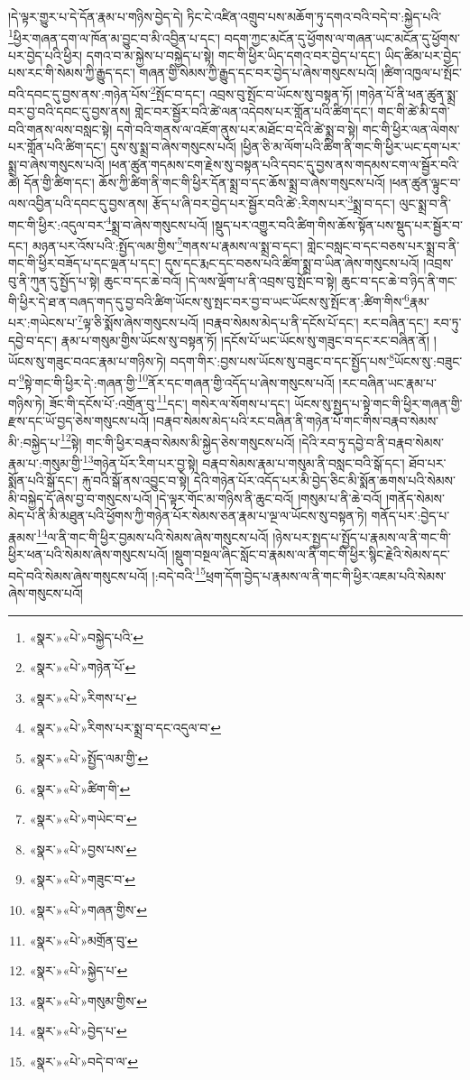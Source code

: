 །དེ་ལྟར་གྱུར་པ་དེ་དོན་རྣམ་པ་གཉིས་བྱེད་དེ། ཏིང་ངེ་འཛིན་འགྲུབ་པས་མཆོག་ཏུ་དགའ་བའི་བདེ་བ་:སྐྱེད་པའི་\footnote{«སྣར་»«པེ་»བསྐྱེད་པའི་}ཕྱིར་གཞན་དག་ལ་ཁོན་མ་བྱུང་བ་མི་འབྱིན་པ་དང་། བདག་ཀྱང་མངོན་དུ་ཕྱོགས་ལ་གཞན་ཡང་མངོན་དུ་ཕྱོགས་པར་བྱེད་པའི་ཕྱིར། དགའ་བ་མ་སྐྱེས་པ་བསྐྱེད་པ་སྟེ། གང་གི་ཕྱིར་ཡིད་དགའ་བར་བྱེད་པ་དང་། ཡིད་ཚིམ་པར་བྱེད་པས་རང་གི་སེམས་ཀྱི་རྒྱུད་དང་། གཞན་གྱི་སེམས་ཀྱི་རྒྱུད་དང་བར་བྱེད་པ་ཞེས་གསུངས་པའོ། །ཚིག་འཁྱལ་པ་སྤོང་བའི་དབང་དུ་བྱས་ནས་:གཉེན་པོས་\footnote{«སྣར་»«པེ་»གཉེན་པོ་}སྤོང་བ་དང་། འབྲས་བུ་སྤོང་བ་ཡོངས་སུ་བསྟན་ཏོ། །གཉེན་པོ་ནི་ཕན་ཚུན་སྨྲ་བར་བྱ་བའི་དབང་དུ་བྱས་ནས། གླེང་བར་སྦྱོར་བའི་ཚེ་ལན་འདེབས་པར་གློན་པའི་ཚིག་དང་། གང་གི་ཚེ་མི་དགེ་བའི་གནས་ལས་བསླང་སྟེ། དགེ་བའི་གནས་ལ་འཇོག་ནུས་པར་མཐོང་བ་དེའི་ཚེ་སྨྲ་བ་སྟེ། གང་གི་ཕྱིར་ལན་ལེགས་པར་གློན་པའི་ཚིག་དང་། དུས་སུ་སྨྲ་བ་ཞེས་གསུངས་པའོ། །ཕྱིན་ཅི་མ་ལོག་པའི་ཚིག་ནི་གང་གི་ཕྱིར་ཡང་དག་པར་སྨྲ་བ་ཞེས་གསུངས་པའོ། །ཕན་ཚུན་གདམས་ངག་རྗེས་སུ་བསྟན་པའི་དབང་དུ་བྱས་ནས་གདམས་ངག་ལ་སྦྱོར་བའི་ཚེ། དོན་གྱི་ཚིག་དང་། ཆོས་ཀྱི་ཚིག་ནི་གང་གི་ཕྱིར་དོན་སྨྲ་བ་དང་ཆོས་སྨྲ་བ་ཞེས་གསུངས་པའོ། །ཕན་ཚུན་ལྟུང་བ་ལས་འབྱིན་པའི་དབང་དུ་བྱས་ནས། རྩོད་པ་ཞི་བར་བྱེད་པར་སྦྱོར་བའི་ཚེ་:རིགས་པར་\footnote{«སྣར་»«པེ་»རིགས་པ་}སྨྲ་བ་དང་། ལུང་སྨྲ་བ་ནི་གང་གི་ཕྱིར་:འདུལ་བར་\footnote{«སྣར་»«པེ་»རིགས་པར་སྨྲ་བ་དང་འདུལ་བ་}སྨྲ་བ་ཞེས་གསུངས་པའོ། །སྡུད་པར་འགྱུར་བའི་ཚིག་གིས་ཆོས་སྟོན་པས་སྡུད་པར་སྦྱོར་བ་དང་། མཉན་པར་འོས་པའི་:སྤྱོད་ལམ་གྱིས་\footnote{«སྣར་»«པེ་»སྤྱོད་ལམ་གྱི་}གནས་པ་རྣམས་ལ་སྨྲ་བ་དང་། གླེང་བསླང་བ་དང་བཅས་པར་སྨྲ་བ་ནི་གང་གི་ཕྱིར་བཟོད་པ་དང་ལྡན་པ་དང་། དུས་དང་རྨང་དང་བཅས་པའི་ཚིག་སྨྲ་བ་ཡིན་ཞེས་གསུངས་པའོ། །འབྲས་བུ་ནི་ཀུན་དུ་སྤྱོད་པ་སྟེ། ཆུང་བ་དང་ཆེ་བའོ། །དེ་ལས་ལྡོག་པ་ནི་འབྲས་བུ་སྤོང་བ་སྟེ། ཆུང་བ་དང་ཆེ་བ་ཉིད་ནི་གང་གི་ཕྱིར་དེ་ཐ་ན་བཞད་གད་དུ་བྱ་བའི་ཚིག་ཡོངས་སུ་སྤང་བར་བྱ་བ་ཡང་ཡོངས་སུ་སྤོང་ན་:ཚིག་གིས་\footnote{«སྣར་»«པེ་»ཚིག་གི་}རྣམ་པར་:གཡེངས་པ་\footnote{«སྣར་»«པེ་»གཡེང་བ་}ལྟ་ཅི་སྨོས་ཞེས་གསུངས་པའོ། །བརྣབ་སེམས་མེད་པ་ནི་དངོས་པོ་དང་། རང་བཞིན་དང་། རབ་ཏུ་དབྱེ་བ་དང་། རྣམ་པ་གསུམ་གྱིས་ཡོངས་སུ་བསྟན་ཏོ། །དངོས་པོ་ཡང་ཡོངས་སུ་གཟུང་བ་དང་རང་བཞིན་ནོ། །ཡོངས་སུ་གཟུང་བའང་རྣམ་པ་གཉིས་ཏེ། བདག་གིར་:བྱས་པས་ཡོངས་སུ་བཟུང་བ་དང་སྤྱོད་པས་\footnote{«སྣར་»«པེ་»བྱས་པས་}ཡོངས་སུ་:བཟུང་བ་\footnote{«སྣར་»«པེ་»གཟུང་བ་}སྟེ་གང་གི་ཕྱིར་དེ་:གཞན་གྱི་\footnote{«སྣར་»«པེ་»གཞན་གྱིས་}ནོར་དང་གཞན་གྱི་འདོད་པ་ཞེས་གསུངས་པའོ། །རང་བཞིན་ཡང་རྣམ་པ་གཉིས་ཏེ། ཟོང་གི་དངོས་པོ་:འགྲོན་བུ་\footnote{«སྣར་»«པེ་»མགྲོན་བུ་}དང་། གསེར་ལ་སོགས་པ་དང་། ཡོངས་སུ་སྤྱད་པ་སྟེ་གང་གི་ཕྱིར་གཞན་གྱི་རྫས་དང་ཡོ་བྱད་ཅེས་གསུངས་པའོ། །བརྣབ་སེམས་མེད་པའི་རང་བཞིན་ནི་གཉེན་པོ་གང་གིས་བརྣབ་སེམས་མི་:བསྐྱེད་པ་\footnote{«སྣར་»«པེ་»སྐྱེད་པ་}སྟེ། གང་གི་ཕྱིར་བརྣབ་སེམས་མི་སྐྱེད་ཅེས་གསུངས་པའོ། །དེའི་རབ་ཏུ་དབྱེ་བ་ནི་བརྣབ་སེམས་རྣམ་པ་:གསུམ་གྱི་\footnote{«སྣར་»«པེ་»གསུམ་གྱིས་}གཉེན་པོར་རིག་པར་བྱ་སྟེ། བརྣབ་སེམས་རྣམ་པ་གསུམ་ནི་བསླང་བའི་སྒོ་དང་། ཐོབ་པར་སྨོན་པའི་སྒོ་དང་། རྐུ་བའི་སྒོ་ནས་འབྱུང་བ་སྟེ། དེའི་གཉེན་པོར་འདོད་པར་མི་བྱེད་ཅིང་མི་སྨོན་ཆགས་པའི་སེམས་མི་བསྐྱེད་དོ་ཞེས་བྱ་བ་གསུངས་པའོ། །དེ་ལྟར་གོང་མ་གཉིས་ནི་ཆུང་བའོ། །གསུམ་པ་ནི་ཆེ་བའོ། །གནོད་སེམས་མེད་པ་ནི་མི་མཐུན་པའི་ཕྱོགས་ཀྱི་གཉེན་པོར་སེམས་ཅན་རྣམ་པ་ལྔ་ལ་ཡོངས་སུ་བསྟན་ཏེ། གནོད་པར་:བྱེད་པ་རྣམས་\footnote{«སྣར་»«པེ་»བྱེད་པ་}ལ་ནི་གང་གི་ཕྱིར་བྱམས་པའི་སེམས་ཞེས་གསུངས་པའོ། །ཉེས་པར་སྤྱད་པ་སྤྱོད་པ་རྣམས་ལ་ནི་གང་གི་ཕྱིར་ཕན་པའི་སེམས་ཞེས་གསུངས་པའོ། །སྡུག་བསྔལ་ཞིང་སློང་བ་རྣམས་ལ་ནི་གང་གི་ཕྱིར་སྙིང་རྗེའི་སེམས་དང་བདེ་བའི་སེམས་ཞེས་གསུངས་པའོ། །:བདེ་བའི་\footnote{«སྣར་»«པེ་»བདེ་བ་ལ་}ཕྲག་དོག་བྱེད་པ་རྣམས་ལ་ནི་གང་གི་ཕྱིར་འཇམ་པའི་སེམས་ཞེས་གསུངས་པའོ། 